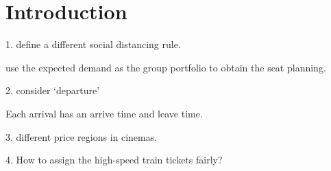 \section{Introduction}
1. define a different social distancing rule.

use the expected demand as the group portfolio to obtain the seat planning.

2. consider `departure'

Each arrival has an arrive time and leave time.


3. different price regions in cinemas.


4. How to assign the high-speed train tickets fairly?


\newpage
